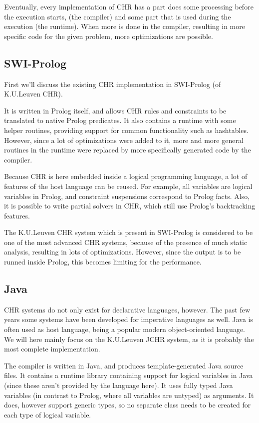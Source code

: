 \documentclass{llncs}
\begin{document}
Eventually, every implementation of CHR has a part does some processing before the execution starts,
(the compiler) and some part that is used during the execution (the runtime). When more is done in the compiler,
resulting in more specific code for the given problem, more optimizations are possible. 

\subsection{SWI-Prolog}

First we'll discuss the existing CHR implementation in SWI-Prolog (of K.U.Leuven CHR).

It is written in Prolog itself, and allows CHR rules and constraints to be translated
to native Prolog predicates. It also contains a runtime with some helper routines,
providing support for common functionality such as hashtables. However, since a lot of
optimizations were added to it, more and more general routines in the runtime were
replaced by more specifically generated code by the compiler.

Because CHR is here embedded inside a logical programming language, a lot of features of
the host language can be reused. For example, all variables are logical variables in Prolog, and constraint
suspensions correspond to Prolog facts. Also, it is possible to write partial solvers in
CHR, which still use Prolog's backtracking features.

The K.U.Leuven CHR system which is present in SWI-Prolog is considered to be one of the most
advanced CHR systems, because of the presence of much static analysis, resulting in lots of
optimizations. However, since the output is to be runned inside Prolog, this becomes limiting
for the performance.

\subsection{Java}

CHR systems do not only exist for declarative languages, however. The past few years some
systems have been developed for imperative languages as well. Java is often used as
host language, being a popular modern object-oriented language. We will here mainly focus
on the K.U.Leuven JCHR system, as it is probably the most complete implementation.

The compiler is written in Java, and produces template-generated Java source files. It contains
a runtime library containing support for logical variables in Java (since these aren't provided
by the language here). It uses fully typed Java variables (in contrast to Prolog, where all variables
are untyped) as arguments. It does, however support generic types, so no separate class needs to
be created for each type of logical variable.
\end{document}
